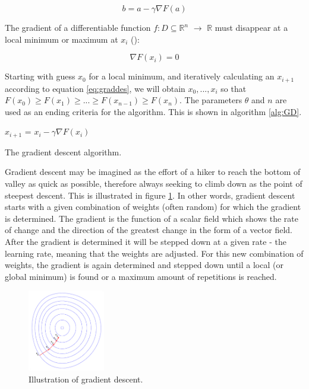 \documentclass[10pt,a4paper,DIV=11]{scrreprt}
\begin{document}
\begin{equation}
 b = a - \gamma \nabla F(a)
\label{eq:graddes}
\end{equation} 

The gradient of a differentiable function $f: D \subseteq \mathds{R}^n$ $\rightarrow$ $\mathds{R}$ must disappear at a local minimum or maximum 
at $x_i$ (\cite{MATHINF}):

\begin{equation}
\nabla F(x_i) = 0
\end{equation} 

Starting with guess $x_0$ for a local minimum, and iteratively calculating an $x_{i+1}$ according to equation \eqref{eq:graddes}, we will obtain 
$x_0, ..., x_i$ so that $F(x_0) \geq F(x_1) \geq ... \geq F(x_{n-1}) \geq F(x_n)$. The parameters $\theta$ and $n$ are used as an ending 
criteria for the algorithm. This is shown in algorithm \ref{alg:GD}.

\begin{algorithm}
\LinesNumbered
\DontPrintSemicolon
\BlankLine
{}
\BlankLine
\Begin
{
    {
        $x_{i+1}$ = $x_i - \gamma \nabla F(x_i)$
    }
}
\caption{The gradient descent algorithm.}
\label{alg:GD}
\end{algorithm}

Gradient descent may be imagined as the effort of a hiker to reach the bottom of valley as quick as possible, therefore always seeking 
to climb down as the point of steepest descent. This is illustrated in figure \ref{fig:grad}.
In other words, gradient descent starts with a given combination of weights (often random) for which the gradient is determined. The gradient is 
the function of a scalar field which shows the rate of change and the direction of the greatest change in the form of a vector field. After the 
gradient is determined it will be stepped down at a given rate - the learning rate, meaning that the weights are adjusted. For this new combination 
of weights, the gradient is again determined and stepped down until a local (or global minimum) is found or a maximum amount of repetitions is 
reached.

\begin{figure}[H]

    \centering
    \includegraphics[width=0.3\textwidth,scale=1]{files/graddes.png} 
    \caption{Illustration of gradient descent.\cite{GRADFIG}}
    \label{fig:grad}
\end{figure}
\end{document}

